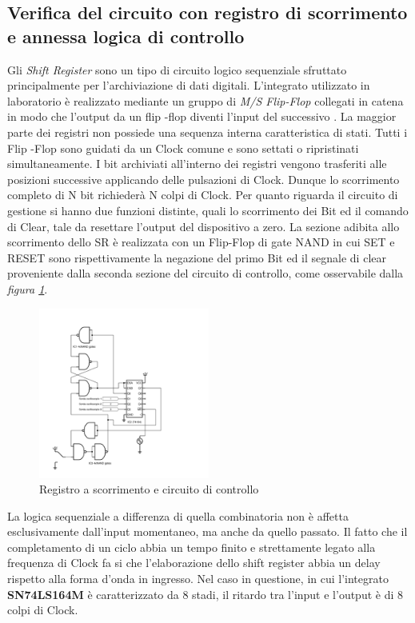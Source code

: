 \documentclass[journal]{IEEEtran}
\begin{document}
\subsection{Verifica del circuito con registro di scorrimento e annessa logica di controllo}
Gli \textit{Shift Register} sono un tipo di circuito logico sequenziale sfruttato principalmente per l'archiviazione di dati digitali. L’integrato utilizzato in laboratorio è realizzato mediante un gruppo di \textit{M/S Flip-Flop} collegati in catena in modo che l'output da un flip -flop diventi l'input del successivo . La maggior parte dei registri non possiede una sequenza interna caratteristica di stati. Tutti i Flip -Flop sono guidati da un Clock comune e  sono settati o ripristinati simultaneamente.
I bit archiviati all’interno dei registri vengono trasferiti alle posizioni successive applicando delle pulsazioni di Clock. Dunque lo scorrimento completo di N bit richiederà N colpi di Clock.
Per quanto riguarda il circuito di gestione si hanno due funzioni distinte, quali lo scorrimento dei Bit ed il comando di Clear, tale da resettare l'output del dispositivo a zero.
La sezione adibita allo scorrimento dello SR è realizzata con un Flip-Flop di gate NAND in cui SET e RESET sono rispettivamente la negazione del primo Bit ed il segnale di clear proveniente dalla seconda sezione del circuito di controllo, come osservabile dalla \textit{figura \ref{fig:circuit_shift_register}}. 

\begin{figure}[H]%
\begin{center}
\includegraphics[width=0.50\textwidth]{sch-simulations/digital/output/shift-register.pdf}
\caption{Registro a scorrimento e circuito di controllo}
\label{fig:circuit_shift_register}
\end{center}
\end{figure}

La logica sequenziale a differenza di quella combinatoria non è affetta esclusivamente dall’input momentaneo, ma anche da quello passato. Il fatto che il completamento di un ciclo abbia un tempo finito e strettamente legato alla frequenza di Clock fa si che l’elaborazione dello  shift register abbia un delay rispetto alla forma d’onda in ingresso. Nel caso in questione, in cui l'integrato \textbf{SN74LS164M} è caratterizzato da 8 stadi, il ritardo tra l’input e l’output è di 8 colpi di Clock.
\end{document}
